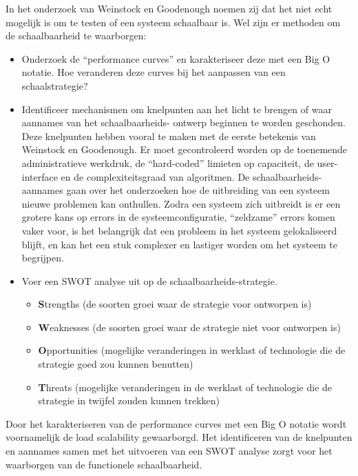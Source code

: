 In het onderzoek van Weinstock en Goodenough \parencite{OnSystemScalability} noemen zij dat het niet echt mogelijk is om te testen of een systeem schaalbaar is. Wel zijn er methoden om de schaalbaarheid te waarborgen:
\begin{itemize}
	\item Onderzoek de \enquote{performance curves} en karakteriseer deze met een Big O notatie. Hoe veranderen deze curves bij het aanpassen van een schaalstrategie? 
	
	\item Identificeer mechanismen om knelpunten aan het licht te brengen of waar aannames van het schaalbaarheids- ontwerp beginnen te worden geschonden. Deze knelpunten hebben vooral te maken met de eerste betekenis van Weinstock en Goodenough. Er moet gecontroleerd worden op de toenemende administratieve werkdruk, de \enquote{hard-coded} limieten op capaciteit, de user-interface en de complexiteitsgraad van algoritmen. De schaalbaarheids-aannames gaan over het onderzoeken hoe de uitbreiding van een systeem nieuwe problemen kan onthullen. Zodra een systeem zich uitbreidt is er een grotere kans op errors in de systeemconfiguratie, \enquote{zeldzame} errors komen vaker voor, is het belangrijk dat een probleem in het systeem gelokaliseerd blijft, en kan het een stuk complexer en lastiger worden om het systeem te begrijpen.
	
	\item Voer een SWOT analyse uit op de schaalbaarheids-strategie.
	\begin{itemize}
		\item \textbf{S}trengths (de soorten groei waar de strategie voor ontworpen is)
		\item \textbf{W}eaknesses (de soorten groei waar de strategie niet voor ontworpen is)
		\item \textbf{O}pportunities (mogelijke veranderingen in werklast of technologie die de strategie goed zou kunnen benutten)
		\item \textbf{T}hreats (mogelijke veranderingen in de werklast of technologie die de strategie in twijfel zouden kunnen trekken)
	\end{itemize}
\end{itemize}

Door het karakteriseren van de performance curves met een Big O notatie wordt voornamelijk de load scalability gewaarborgd. Het identificeren van de knelpunten en aannames samen met het uitvoeren van een SWOT analyse zorgt voor het waarborgen van de functionele schaalbaarheid.
 
